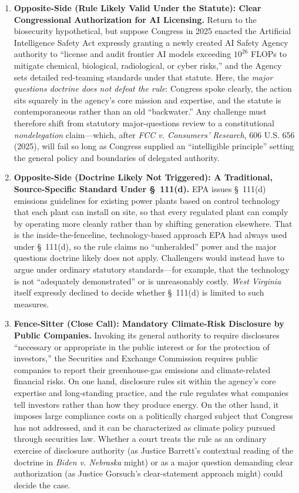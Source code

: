 \documentclass[12pt]{article}
\begin{document}
\begin{enumerate}
\item \textbf{Opposite-Side (Rule Likely Valid Under the Statute): Clear Congressional Authorization for AI Licensing.} Return to the biosecurity hypothetical, but suppose Congress in 2025 enacted the Artificial Intelligence Safety Act expressly granting a newly created AI Safety Agency authority to ``license and audit frontier AI models exceeding $10^{26}$ FLOPs to mitigate chemical, biological, radiological, or cyber risks,'' and the Agency sets detailed red-teaming standards under that statute. Here, the \textit{major questions doctrine does not defeat the rule}: Congress spoke clearly, the action sits squarely in the agency's core mission and expertise, and the statute is contemporaneous rather than an old ``backwater.'' Any challenge must therefore shift from statutory major-questions review to a constitutional \textit{nondelegation} claim---which, after \textit{FCC v. Consumers' Research}, 606 U.S. 656 (2025), will fail so long as Congress supplied an ``intelligible principle'' setting the general policy and boundaries of delegated authority.

\item \textbf{Opposite-Side (Doctrine Likely Not Triggered): A Traditional, Source-Specific Standard Under \S~111(d).} EPA issues \S~111(d) emissions guidelines for existing power plants based on control technology that each plant can install on site, so that every regulated plant can comply by operating more cleanly rather than by shifting generation elsewhere. That is the inside-the-fenceline, technology-based approach EPA had always used under \S~111(d), so the rule claims no ``unheralded'' power and the major questions doctrine likely does not apply. Challengers would instead have to argue under ordinary statutory standards---for example, that the technology is not ``adequately demonstrated'' or is unreasonably costly. \textit{West Virginia} itself expressly declined to decide whether \S~111(d) is limited to such measures.

\item \textbf{Fence-Sitter (Close Call): Mandatory Climate-Risk Disclosure by Public Companies.} Invoking its general authority to require disclosures ``necessary or appropriate in the public interest or for the protection of investors,'' the Securities and Exchange Commission requires public companies to report their greenhouse-gas emissions and climate-related financial risks. On one hand, disclosure rules sit within the agency's core expertise and long-standing practice, and the rule regulates what companies tell investors rather than how they produce energy. On the other hand, it imposes large compliance costs on a politically charged subject that Congress has not addressed, and it can be characterized as climate policy pursued through securities law. Whether a court treats the rule as an ordinary exercise of disclosure authority (as Justice Barrett's contextual reading of the doctrine in \textit{Biden v. Nebraska} might) or as a major question demanding clear authorization (as Justice Gorsuch's clear-statement approach might) could decide the case.

\end{enumerate}
\end{document}
